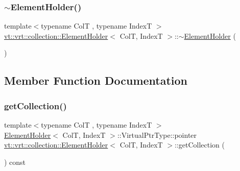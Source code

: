 \mbox{\label{structvt_1_1vrt_1_1collection_1_1_element_holder_a04bbd1ceb1c94a4adaedeca1fc6d4acf}} 
\subsubsection{\texorpdfstring{$\sim$\+Element\+Holder()}{~ElementHolder()}}
{\footnotesize\ttfamily template$<$typename ColT , typename IndexT $>$ \\
\hyperlink{structvt_1_1vrt_1_1collection_1_1_element_holder}{vt\+::vrt\+::collection\+::\+Element\+Holder}$<$ ColT, IndexT $>$\+::$\sim$\hyperlink{structvt_1_1vrt_1_1collection_1_1_element_holder}{Element\+Holder} (\begin{DoxyParamCaption}{ }\end{DoxyParamCaption})\hspace{0.3cm}{\ttfamily [virtual]}}



\subsection{Member Function Documentation}
\mbox{\label{structvt_1_1vrt_1_1collection_1_1_element_holder_a737123e80d701335e9989bc300b0868b}} 
\subsubsection{\texorpdfstring{get\+Collection()}{getCollection()}}
{\footnotesize\ttfamily template$<$typename ColT , typename IndexT $>$ \\
\hyperlink{structvt_1_1vrt_1_1collection_1_1_element_holder}{Element\+Holder}$<$ ColT, IndexT $>$\+::Virtual\+Ptr\+Type\+::pointer \hyperlink{structvt_1_1vrt_1_1collection_1_1_element_holder}{vt\+::vrt\+::collection\+::\+Element\+Holder}$<$ ColT, IndexT $>$\+::get\+Collection (\begin{DoxyParamCaption}{ }\end{DoxyParamCaption}) const}



